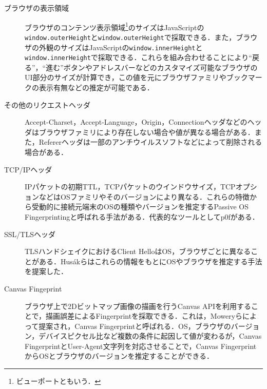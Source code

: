 \begin{description}
\item[ブラウザの表示領域]ブラウザのコンテンツ表示領域\footnote{ビューポートともいう．}のサイズはJavaScriptの\texttt{window.outerHeight}と\texttt{window.outerHeight}で採取できる．また，ブラウザの外観のサイズはJavaScriptの\texttt{window.innerHeight}と\texttt{window.innerHeight}で採取できる．これらを組み合わせることにより``戻る''，``進む''ボタンやアドレスバーなどのカスタマイズ可能なブラウザのUI部分のサイズが計算でき，この値を元にブラウザファミリやブックマークの表示有無などの推定が可能である．
\item[その他のリクエストヘッダ]Accept-Charset，Accept-Language，Origin，Connectionヘッダなどのヘッダはブラウザファミリにより存在しない場合や値が異なる場合がある．また，Refererヘッダは一部のアンチウイルスソフトなどによって削除される場合がある．
\item[TCP/IPヘッダ]IPパケットの初期TTL，TCPパケットのウインドウサイズ，TCPオプションなどはOSファミリやそのバージョンにより異なる．これらの特徴から受動的に接続元端末のOSの種類やバージョンを推定するPassive OS Fingerprintingと呼ばれる手法がある．代表的なツールとしてp0f\cite{p0f}がある．
\item[SSL/TLSヘッダ]TLSハンドシェイクにおけるClient HelloはOS，ブラウザごとに異なることがある．Hus{\'a}kら\cite{husak2016https}はこれらの情報をもとにOSやブラウザを推定する手法を提案した．
\item[Canvas Fingeprint]ブラウザ上で2Dビットマップ画像の描画を行うCanvas APIを利用することで，描画誤差によるFingerprintを採取できる．これは，Moweryら\cite{mowery2012pixel}によって提案され，Canvas Fingerprintと呼ばれる．OS，ブラウザのバージョン，デバイスピクセル比など複数の条件に起因して値が変わるが，Canvas FingerprintとUser-Agent文字列を対応させることで，Canvas FingerprintからOSとブラウザのバージョンを推定することができる．
\end{description}
